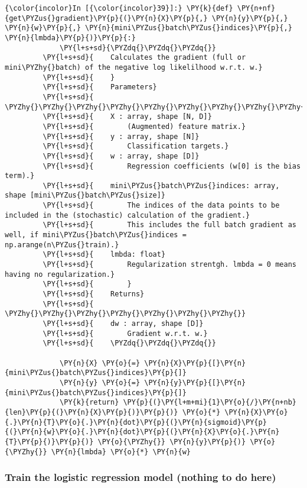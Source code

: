     \begin{Verbatim}[commandchars=\\\{\}]
{\color{incolor}In [{\color{incolor}39}]:} \PY{k}{def} \PY{n+nf}{get\PYZus{}gradient}\PY{p}{(}\PY{n}{X}\PY{p}{,} \PY{n}{y}\PY{p}{,} \PY{n}{w}\PY{p}{,} \PY{n}{mini\PYZus{}batch\PYZus{}indices}\PY{p}{,} \PY{n}{lmbda}\PY{p}{)}\PY{p}{:}
             \PY{l+s+sd}{\PYZdq{}\PYZdq{}\PYZdq{}}
         \PY{l+s+sd}{    Calculates the gradient (full or mini\PYZhy{}batch) of the negative log likelilhood w.r.t. w.}
         \PY{l+s+sd}{    }
         \PY{l+s+sd}{    Parameters}
         \PY{l+s+sd}{    \PYZhy{}\PYZhy{}\PYZhy{}\PYZhy{}\PYZhy{}\PYZhy{}\PYZhy{}\PYZhy{}\PYZhy{}\PYZhy{}}
         \PY{l+s+sd}{    X : array, shape [N, D]}
         \PY{l+s+sd}{        (Augmented) feature matrix.}
         \PY{l+s+sd}{    y : array, shape [N]}
         \PY{l+s+sd}{        Classification targets.}
         \PY{l+s+sd}{    w : array, shape [D]}
         \PY{l+s+sd}{        Regression coefficients (w[0] is the bias term).}
         \PY{l+s+sd}{    mini\PYZus{}batch\PYZus{}indices: array, shape [mini\PYZus{}batch\PYZus{}size]}
         \PY{l+s+sd}{        The indices of the data points to be included in the (stochastic) calculation of the gradient.}
         \PY{l+s+sd}{        This includes the full batch gradient as well, if mini\PYZus{}batch\PYZus{}indices = np.arange(n\PYZus{}train).}
         \PY{l+s+sd}{    lmbda: float}
         \PY{l+s+sd}{        Regularization strentgh. lmbda = 0 means having no regularization.}
         \PY{l+s+sd}{        }
         \PY{l+s+sd}{    Returns}
         \PY{l+s+sd}{    \PYZhy{}\PYZhy{}\PYZhy{}\PYZhy{}\PYZhy{}\PYZhy{}\PYZhy{}}
         \PY{l+s+sd}{    dw : array, shape [D]}
         \PY{l+s+sd}{        Gradient w.r.t. w.}
         \PY{l+s+sd}{    \PYZdq{}\PYZdq{}\PYZdq{}}
             
             \PY{n}{X} \PY{o}{=} \PY{n}{X}\PY{p}{[}\PY{n}{mini\PYZus{}batch\PYZus{}indices}\PY{p}{]}
             \PY{n}{y} \PY{o}{=} \PY{n}{y}\PY{p}{[}\PY{n}{mini\PYZus{}batch\PYZus{}indices}\PY{p}{]}
             \PY{k}{return} \PY{p}{(}\PY{l+m+mi}{1}\PY{o}{/}\PY{n+nb}{len}\PY{p}{(}\PY{n}{X}\PY{p}{)}\PY{p}{)} \PY{o}{*} \PY{n}{X}\PY{o}{.}\PY{n}{T}\PY{o}{.}\PY{n}{dot}\PY{p}{(}\PY{n}{sigmoid}\PY{p}{(}\PY{n}{w}\PY{o}{.}\PY{n}{dot}\PY{p}{(}\PY{n}{X}\PY{o}{.}\PY{n}{T}\PY{p}{)}\PY{p}{)} \PY{o}{\PYZhy{}} \PY{n}{y}\PY{p}{)} \PY{o}{\PYZhy{}} \PY{n}{lmbda} \PY{o}{*} \PY{n}{w}
\end{Verbatim}

    \hypertarget{train-the-logistic-regression-model-nothing-to-do-here}{%
\subsubsection{Train the logistic regression model (nothing to do
here)}\label{train-the-logistic-regression-model-nothing-to-do-here}}

